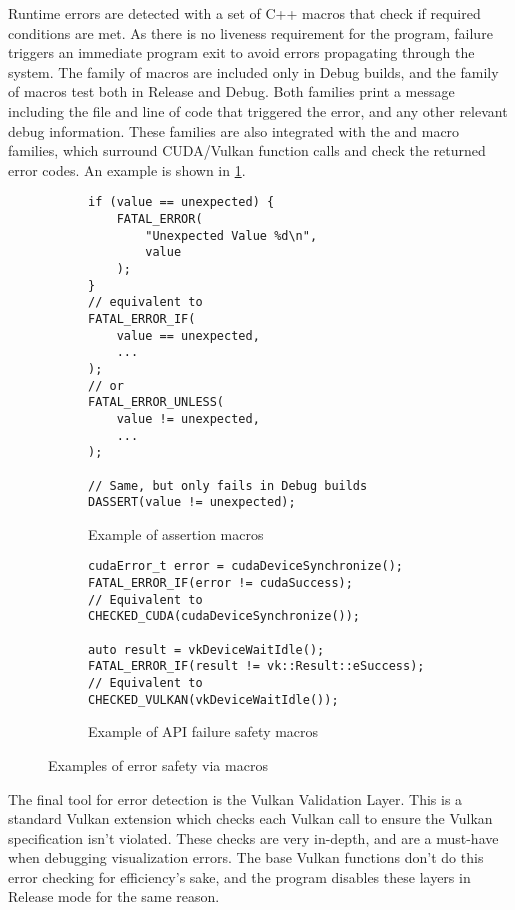 Runtime errors are detected with a set of C++ macros that check if required conditions are met.
As there is no liveness requirement for the program, failure triggers an immediate program exit to avoid errors propagating through the system.
The  family of macros are included only in Debug builds, and the  family of macros test both in Release and Debug.
Both families print a message including the file and line of code that triggered the error, and any other relevant debug information.
These families are also integrated with the  and  macro families, which surround CUDA/Vulkan function calls and check the returned error codes.
An example is shown in \cref{fig:ImplAssertions}.
\begin{figure}[t]
    \centering
    \begin{subfigure}{0.49\textwidth}
        \begin{verbatim}
if (value == unexpected) {
    FATAL_ERROR(
        "Unexpected Value %d\n",
        value
    );
}
// equivalent to
FATAL_ERROR_IF(
    value == unexpected,
    ...
);
// or
FATAL_ERROR_UNLESS(
    value != unexpected,
    ...
);

// Same, but only fails in Debug builds
DASSERT(value != unexpected);
        \end{verbatim}
        \caption{Example of assertion macros}
    \end{subfigure}%
    \begin{subfigure}{0.49\textwidth}
        \begin{verbatim}
cudaError_t error = cudaDeviceSynchronize();
FATAL_ERROR_IF(error != cudaSuccess);
// Equivalent to
CHECKED_CUDA(cudaDeviceSynchronize());

auto result = vkDeviceWaitIdle();
FATAL_ERROR_IF(result != vk::Result::eSuccess);
// Equivalent to
CHECKED_VULKAN(vkDeviceWaitIdle());
        \end{verbatim}
        \caption{Example of API failure safety macros}
    \end{subfigure}
    \caption{Examples of error safety via macros}
    \label{fig:ImplAssertions}
\end{figure}

The final tool for error detection is the Vulkan Validation Layer.
This is a standard Vulkan extension which checks each Vulkan call to ensure the Vulkan specification \cite{TheKhronosGroupVulkanSpec} isn't violated.
These checks are very in-depth, and are a must-have when debugging visualization errors.
The base Vulkan functions don't do this error checking for efficiency's sake, and the program disables these layers in Release mode for the same reason.

